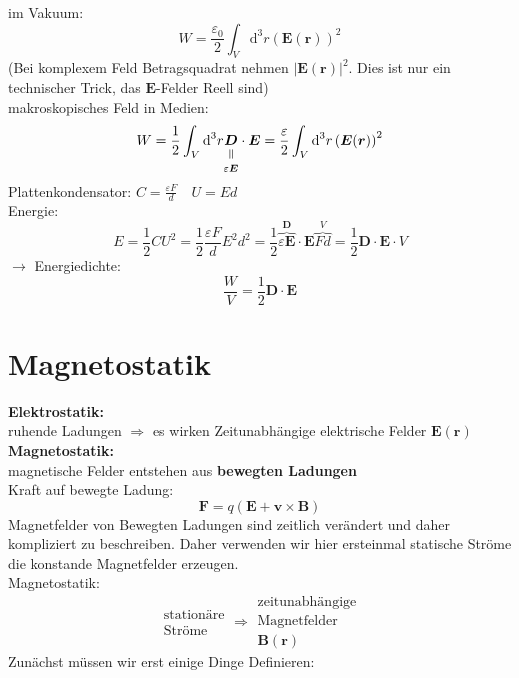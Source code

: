 \documentclass[titlepage,11pt,a4paper,ngerman]{report}
\newcommand{\tx}[1]{\textrm{#1}}
\newcommand{\ob}[1]{\overbrace{#1}}
\newcommand{\dd}{\tx{d}}
\newcommand{\verteq}{\rotatebox{90}{$\,=$}}
\newcommand{\equalto}[2]{\underset{\scriptstyle\overset{\mkern4mu\verteq}{#2}}{#1}}
\renewcommand{\vec}[1]{\boldsymbol{#1}}
\newcommand{\lcom}[1]{\color{MidnightBlue}#1\color{black}}
\renewcommand{\epsilon}{\varepsilon}
\begin{document}
im Vakuum:
\begin{equation*}
W = \frac{\epsilon_0}{2} \int_V \dd^3r \left(\vec{E}(\vec{r})\right)^2
\end{equation*}
(Bei komplexem Feld Betragsquadrat nehmen $ |\vec{E}(\vec{r})|^2 $. Dies ist nur ein technischer Trick, das $ \vec{E} $-Felder Reell sind)\\[5pt]
makroskopisches Feld in Medien:
\begin{equation*}
W = \frac{1}{2} \int_V \dd^3r \equalto{\vec{D}}{\epsilon \vec{E}} \cdot \vec{E} = \frac{\epsilon}{2} \int_V \dd^3 r \left(\vec{E}(\vec{r})\right)^2
\end{equation*}
Plattenkondensator: $ C = \frac{\epsilon F}{d} \quad U = E d $\\
Energie:
$$ E = \frac{1}{2} CU^2 = \frac{1}{2} \frac{\epsilon F}{d} E^2 d^2 = \frac{1}{2} \ob{\epsilon \vec{E}}^{\vec{D}} \cdot \vec{E} \ob{F d}^{V} = \frac{1}{2} \vec{D} \cdot \vec{E} \cdot V $$
$ \rightarrow $ Energiedichte:
\begin{equation*}
\frac{W}{V} = \frac{1}{2} \vec{D} \cdot \vec{E}
\end{equation*}

\chapter{Magnetostatik}

\textbf{Elektrostatik:}\\
ruhende Ladungen $ \Rightarrow $ es wirken Zeitunabhängige elektrische Felder $ \vec{E}(\vec{r}) $\\[5pt]
\textbf{Magnetostatik:}\\
magnetische Felder entstehen aus \textbf{bewegten Ladungen}\\
Kraft auf bewegte Ladung:
\begin{equation*}
\vec{F} = q (\vec{E} + \vec{v} \times \vec{B})
\end{equation*}
\lcom{Magnetfelder von Bewegten Ladungen sind zeitlich verändert und daher kompliziert zu beschreiben. Daher verwenden wir hier ersteinmal statische Ströme die konstande Magnetfelder erzeugen.}\\[3pt]
Magnetostatik:
$$ \begin{array}{c}
\tx{stationäre}\\ \tx{Ströme}
\end{array} \Rightarrow \begin{array}{c}
\tx{zeitunabhängige} \\ \tx{Magnetfelder} \\ \vec{B}(\vec{r})
\end{array} $$
\lcom{Zunächst müssen wir erst einige Dinge Definieren:}
\end{document}
